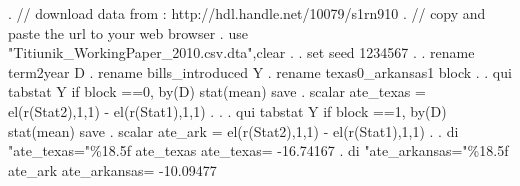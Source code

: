 . // download data from : http://hdl.handle.net/10079/s1rn910
. // copy and paste the url to your web browser
. use "Titiunik_WorkingPaper_2010.csv.dta",clear 
{\smallskip}
. 
. set seed 1234567
{\smallskip}
. 
.         rename term2year D
{\smallskip}
.         rename bills_introduced Y
{\smallskip}
.         rename texas0_arkansas1 block
{\smallskip}
.         
.         qui tabstat Y if block ==0, by(D) stat(mean) save       
{\smallskip}
.         scalar ate_texas = el(r(Stat2),1,1) - el(r(Stat1),1,1)
{\smallskip}
. 
.         
.         qui tabstat Y if block ==1, by(D) stat(mean) save       
{\smallskip}
.         scalar ate_ark = el(r(Stat2),1,1) - el(r(Stat1),1,1)
{\smallskip}
.         
.         di "ate_texas="\%18.5f ate_texas 
ate_texas=         -16.74167
{\smallskip}
.         di "ate_arkansas="\%18.5f ate_ark        
ate_arkansas=         -10.09477
{\smallskip}

